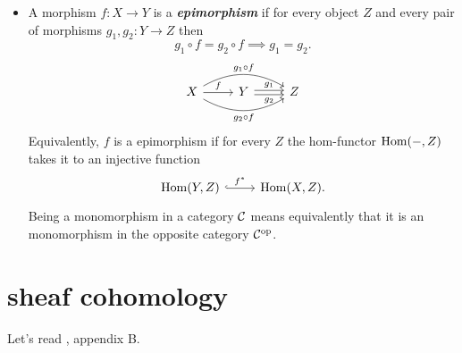 \begin{defn}
\begin{itemize}
		\item A morphism $f:X\to Y$ is a \textbf{\textit{epimorphism}} if for every object $Z$ and every pair of morphisms $g_1,g_2:Y\to Z$ then
		\[g_1\circ f=g_2\circ f\implies g_1=g_2.\]
		\[\begin{tikzcd}
			X\arrow[r,"f"]\arrow[rr,bend right,swap,"g_2\circ f"]\arrow[rr,bend left,"g_1\circ f"]&Y\arrow[r,shift={(0,.06)},"g_1"]\arrow[r,swap,shift={(0,-.06)},"g_2"]&Z
		\end{tikzcd}\]
		Equivalently, $f$ is a epimorphism if for every $Z$ the hom-functor $\operatorname{Hom}(-,Z)$ takes it to an injective function
		\[\begin{tikzcd}
			\Hom(Y,Z)\arrow[r,hook,"f^*"]&\Hom(X,Z).
		\end{tikzcd}\]
		Being a monomorphism in a category $\mathcal{C}$ means equivalently that it is an monomorphism in the opposite category $\mathcal{C}^{\operatorname{op}}$.
	\end{itemize}
\end{defn}
\section{sheaf cohomology}
Let's read \cite{huybrechts}, appendix B.

